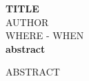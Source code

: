 \begin{center}
  {\huge \bf TITLE} \\
  \vspace{0.2cm}
  {\large AUTHOR} \\
  \vspace{0.2cm}
  {\large WHERE - WHEN} \\
  \vspace{0.2cm}
  {\bf abstract}
\end{center}
ABSTRACT
